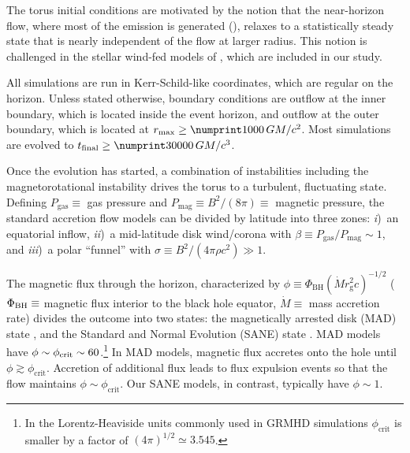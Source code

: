 The torus initial conditions are motivated by the notion that the near-horizon flow, where most of the emission is generated (), relaxes to a statistically steady state that is nearly independent of the flow at larger radius.
This notion is challenged in the stellar wind-fed models of \cite{2020ApJ...896L...6R}, which are included in our study.

All simulations are run in Kerr-Schild-like coordinates, which are regular on the horizon.
Unless stated otherwise, boundary conditions are outflow at the inner boundary, which is located inside the event horizon, and outflow at the outer boundary, which is located at $r_{\rm max} \ge \no{1000}\,\rg$.
Most simulations are evolved to $t_\mathrm{final} \ge  \no{30000}\,\tg$.

Once the evolution has started, a combination of instabilities including the magnetorotational instability \citep[MRI,][]{1992ApJ...400..610B} drives the torus to a turbulent, fluctuating state.
Defining $P_\mathrm{gas} \equiv$ gas pressure and $P_\mathrm{mag} \equiv B^2 / (8\pi) \equiv$ magnetic pressure, the standard accretion flow models can be divided by latitude into three zones:
\emph{i})~an equatorial inflow,
\emph{ii})~a mid-latitude disk wind/corona with  $\beta  \equiv P_\mathrm{gas} / P_\mathrm{mag} \sim 1$, and
\emph{iii})~a polar ``funnel'' with $\sigma \equiv B^2/(4\pi \rho c^2) \gg 1$.

The magnetic flux through the horizon, characterized by $\phi \equiv \Phi_{\mathrm{BH}} (\dot{M} r_\mathrm{g}^2 c)^{-1/2}$ ($\Phi_{\rm BH} \equiv$ magnetic flux interior to the black hole equator, $\dot{M} \equiv$ mass accretion rate) divides the outcome into two states:
the magnetically arrested disk (MAD) state \citep[e.g.,][]{1974Ap&SS..28...45B, 2003ApJ...592.1042I, 2003PASJ...55L..69N, 2011MNRAS.418L..79T}, 
and the Standard and Normal Evolution (SANE) state \citep[e.g.,][]{2003ApJ...589..444G, 2003ApJ...599.1238D, 2012MNRAS.426.3241N}.
MAD models have $\phi \sim \phi_{\rm crit} \sim 60$.\footnote{In the Lorentz-Heaviside units commonly used in GRMHD simulations $\phi_\mathrm{crit}$ is smaller by a factor of $(4\pi)^{1/2} \simeq 3.545$.}
In MAD models, magnetic flux accretes onto the hole until $\phi \gtrsim \phi_\mathrm{crit}$.  Accretion of additional flux leads to flux expulsion events so that the flow maintains $\phi \sim \phi_\mathrm{crit}$.  Our SANE models, in contrast, typically have $\phi \sim 1$.

